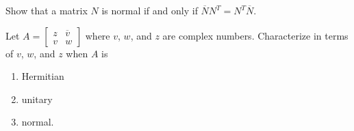\documentclass{ximera}
\begin{document}
\begin{problem}\label{prb:complex_matrices6}
Show that a matrix $N$ is normal if and only if $\overline{N}N^T = N^T\overline{N}$.
\end{problem}

\begin{problem}\label{prb:complex_matrices7}
Let $A = \left[ \begin{array}{cc}
z & \overline{v} \\
v & w
\end{array}\right]$
 where $v$, $w$, and $z$ are complex numbers. Characterize in terms of $v$, $w$, and $z$ when $A$ is

\begin{enumerate}
\item Hermitian
\item unitary
\item normal.
\end{enumerate}
\end{problem}
\end{document}
